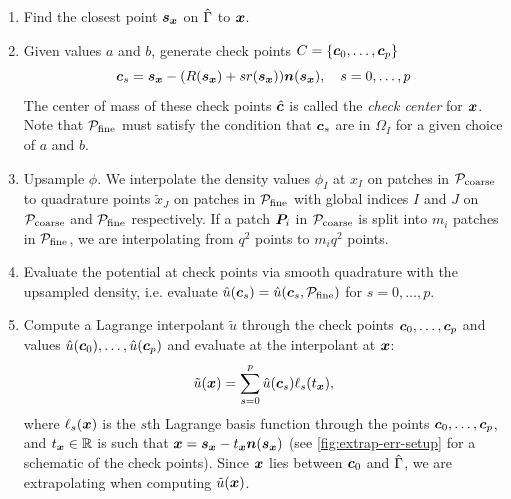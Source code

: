 \begin{enumerate}
  \item Find the closest point ${\bm{s}_{\bm{x}}}$ on $\hat{\Gamma}$ to ${\bm{x}}$.
  \item Given values $a$ and $b$, generate check points $C = \{{\bm{c}}_0, \hdots, {\bm{c}}_{p}\}$ 
    \begin{equation}
      {\bm{c}}_s = {\bm{s}_{\bm{x}}} -(R({\bm{s}_{\bm{x}}}) +s r({\bm{s}_{\bm{x}}})) {\bm{n}}({\bm{s}_{\bm{x}}}), \quad s=0, \hdots, p
      \label{eq:check}
    \end{equation}
    The center of mass of these check points ${\hat{\bm{c}}}$ is called the \textit{check center} for ${\bm{x}}$.
    Note that ${\mathcal{P}_{\mathrm{fine}}}$ must satisfy the condition that ${\bm{c}}_s$ are in $\Omega_I$ for a given choice of $a$ and $b$.
\item Upsample $\phi$. 
  We interpolate the density values $\phi_I$ at $x_I$ on patches in ${\mathcal{P}_{\mathrm{coarse}}}$ to quadrature points $\tilde{x}_J$ on patches in ${\mathcal{P}_{\mathrm{fine}}}$ 
  with global indices $I$ and $J$ on ${\mathcal{P}_{\mathrm{coarse}}}$ and ${\mathcal{P}_{\mathrm{fine}}}$ respectively.
  If a patch ${\bm{P}}_i$ in ${\mathcal{P}_{\mathrm{coarse}}}$ is split into $m_i$ patches in ${\mathcal{P}_{\mathrm{fine}}}$, we are interpolating from $q^2$ points to $m_iq^2$ points.
  \item Evaluate the potential at check points via smooth quadrature with the upsampled density, i.e. evaluate $\hat{u}({\bm{c}}_s) = \hat{u}({\bm{c}}_s, {\mathcal{P}_{\mathrm{fine}}})$ for $s=0,\hdots, p$.
  \item Compute a Lagrange interpolant $\tilde{u}$ through the check points ${\bm{c}}_0,\hdots, {\bm{c}}_p$ and values $\hat{u}({\bm{c}}_0), \hdots, \hat{u}({\bm{c}}_{p})$ and evaluate at the interpolant at ${\bm{x}}$:
      \begin{equation}
          \tilde{u}({\bm{x}}) = \sum_{s=0}^p \hat{u}({\bm{c}}_s)\ell_s(t_{\bm{x}}),
      \end{equation}
        where $\ell_s({\bm{x}})$ is the $s$th Lagrange basis function through the points ${\bm{c}}_0,\hdots, {\bm{c}}_p$, and $t_{\bm{x}}\in \mathbb{R}$ is such that ${\bm{x}} = {\bm{s}_{\bm{x}}} - t_{\bm{x}}{\bm{n}}({\bm{s}_{\bm{x}}})$ (see \cref{fig:extrap-err-setup} for a schematic of the check points).
    Since ${\bm{x}}$ lies between ${\bm{c}}_0$ and $\hat{\Gamma}$, we are extrapolating when computing $\tilde{u}({\bm{x}})$.
\end{enumerate}

